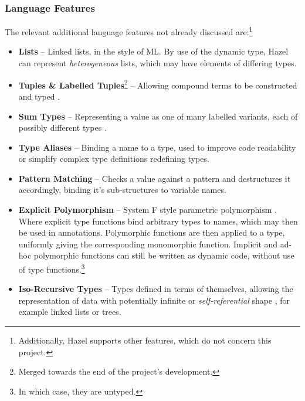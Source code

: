 \subsubsection{Language Features}\label{sec:HazelAdditionalFeatures}
The relevant additional language features not already discussed are:\footnote{Additionally, Hazel supports other features, which do not concern this project.}
\begin{itemize}
\item \textbf{Lists} -- Linked lists, in the style of ML. By use of the dynamic type, Hazel can represent \textit{heterogeneous} lists, which may have elements of differing types.  
\item \textbf{Tuples \& Labelled Tuples}\footnote{Merged towards the end of the project's development.} -- Allowing compound terms to be constructed and typed \cite[ch. 11.7-8]{TAPL}.
\item \textbf{Sum Types} -- Representing a value as one of many labelled variants, each of possibly different types \cite[ch. 11.10]{TAPL}.
\item \textbf{Type Aliases} -- Binding a name to a type, used to improve code readability or simplify complex type definitions redefining types.
\item \textbf{Pattern Matching} -- Checks a value against a pattern and destructures it accordingly, binding it's sub-structures to variable names.
\item \textbf{Explicit Polymorphism} -- System F style parametric polymorphism \cite[ch. 23]{TAPL}. Where explicit type functions bind arbitrary types to names, which may then be used in annotations. Polymorphic functions are then applied to a type, uniformly giving the corresponding monomorphic function. Implicit and ad-hoc polymorphic functions can still be written as dynamic code, without use of type functions.\footnote{In which case, they are untyped.}
\item \textbf{Iso-Recursive Types} -- Types defined in terms of themselves, allowing the representation of data with potentially infinite or \textit{self-referential} shape \cite[ch. 22-23]{TAPL}, for example linked lists or trees.
\end{itemize}

